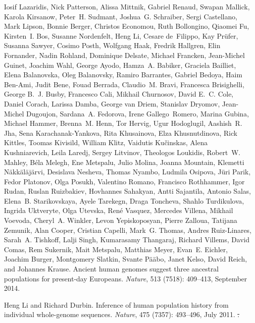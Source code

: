 \documentclass[10pt,letterpaper]{article}
\providecommand{\DIFdel}[1]{{\protect\color{red}\sout{#1}}}                      %
\providecommand{\DIFdelbegin}{} %
\providecommand{\DIFdelend}{} %
\begin{document}
\begin{thebibliography}{80}
Iosif Lazaridis, Nick Patterson, Alissa Mittnik, Gabriel Renaud, Swapan
  Mallick, Karola Kirsanow, Peter~H. Sudmant, Joshua~G. Schraiber, Sergi
  Castellano, Mark Lipson, Bonnie Berger, Christos Economou, Ruth Bollongino,
  Qiaomei Fu, Kirsten~I. Bos, Susanne Nordenfelt, Heng Li, Cesare de~Filippo,
  Kay Prüfer, Susanna Sawyer, Cosimo Posth, Wolfgang Haak, Fredrik Hallgren,
  Elin Fornander, Nadin Rohland, Dominique Delsate, Michael Francken,
  Jean-Michel Guinet, Joachim Wahl, George Ayodo, Hamza~A. Babiker, Graciela
  Bailliet, Elena Balanovska, Oleg Balanovsky, Ramiro Barrantes, Gabriel
  Bedoya, Haim Ben-Ami, Judit Bene, Fouad Berrada, Claudio~M. Bravi, Francesca
  Brisighelli, George B.~J. Busby, Francesco Cali, Mikhail Churnosov, David
  E.~C. Cole, Daniel Corach, Larissa Damba, George van Driem, Stanislav
  Dryomov, Jean-Michel Dugoujon, Sardana~A. Fedorova, Irene Gallego~Romero,
  Marina Gubina, Michael Hammer, Brenna~M. Henn, Tor Hervig, Ugur Hodoglugil,
  Aashish~R. Jha, Sena Karachanak-Yankova, Rita Khusainova, Elza Khusnutdinova,
  Rick Kittles, Toomas Kivisild, William Klitz, Vaidutis Kučinskas, Alena
  Kushniarevich, Leila Laredj, Sergey Litvinov, Theologos Loukidis, Robert~W.
  Mahley, Béla Melegh, Ene Metspalu, Julio Molina, Joanna Mountain, Klemetti
  Näkkäläjärvi, Desislava Nesheva, Thomas Nyambo, Ludmila Osipova, Jüri
  Parik, Fedor Platonov, Olga Posukh, Valentino Romano, Francisco Rothhammer,
  Igor Rudan, Ruslan Ruizbakiev, Hovhannes Sahakyan, Antti Sajantila, Antonio
  Salas, Elena~B. Starikovskaya, Ayele Tarekegn, Draga Toncheva, Shahlo
  Turdikulova, Ingrida Uktveryte, Olga Utevska, René Vasquez, Mercedes
  Villena, Mikhail Voevoda, Cheryl~A. Winkler, Levon Yepiskoposyan, Pierre
  Zalloua, Tatijana Zemunik, Alan Cooper, Cristian Capelli, Mark~G. Thomas,
  Andres Ruiz-Linares, Sarah~A. Tishkoff, Lalji Singh, Kumarasamy Thangaraj,
  Richard Villems, David Comas, Rem Sukernik, Mait Metspalu, Matthias Meyer,
  Evan~E. Eichler, Joachim Burger, Montgomery Slatkin, Svante Pääbo, Janet
  Kelso, David Reich, and Johannes Krause.
\newblock Ancient human genomes suggest three ancestral populations for
  present-day {Europeans}.
\newblock \emph{Nature}, 513 (7518): 409--413, September
  2014.

Heng Li and Richard Durbin.
\newblock Inference of human population history from individual whole-genome
  sequences.
\newblock \emph{Nature}, 475 (7357): 493--496, July 2011.
\DIFdelbegin %
\DIFdel{.
}\DIFdelend 


\end{thebibliography}
\end{document}
